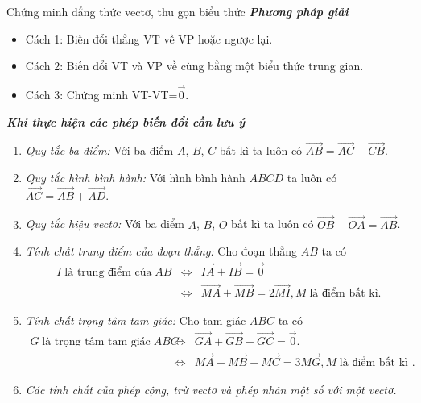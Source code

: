 \begin{dang}%
	{Chứng minh đẳng thức vectơ, thu gọn biểu thức}
	\textbf{\textit{Phương pháp giải}}
	\begin{itemize}
		\item Cách 1: Biến đổi thẳng VT về VP hoặc ngược lại.
		\item Cách 2: Biến đổi VT và VP về cùng bằng một biểu thức trung gian.
		\item Cách 3: Chứng minh VT-VT=$\vec{0}$.
	\end{itemize}
	\textit{\textbf{Khi thực hiện các phép biến đổi cần lưu ý}}
	\begin{enumerate}
		\item \textit{Quy tắc ba điểm:} Với ba điểm $A$, $B$, $C$ bất kì ta luôn có
		      $ \overrightarrow {AB}= \overrightarrow {AC}  +  \overrightarrow{CB}$.
		\item \textit{Quy tắc hình bình hành:} Với hình bình hành $ABCD$ ta luôn có
		      $ \overrightarrow {AC}= \overrightarrow {AB}  +  \overrightarrow{A D}$.
		\item \textit{Quy tắc hiệu vectơ:} Với ba điểm $A$, $B$, $O$ bất kì ta luôn có
		      $ \overrightarrow {OB} -  \overrightarrow{OA}= \overrightarrow {AB}$.
		\item \textit{Tính chất trung điểm của đoạn thẳng:} Cho đoạn thẳng $AB$ ta
		      có
		      \allowdisplaybreaks
		      \begin{eqnarray*}
			      I\;\text{là trung điểm của}\;AB&\Leftrightarrow&
			      \overrightarrow {IA} + \overrightarrow{IB}= \overrightarrow {0}\\
			      &\Leftrightarrow&
			      \overrightarrow {MA}  +  \overrightarrow{MB}=2\overrightarrow{MI}, M \;\text{là điểm bất kì}.
		      \end{eqnarray*}
		\item \textit{Tính chất trọng tâm tam giác:} Cho tam giác $ABC$ ta có
		      \allowdisplaybreaks
		      \begin{eqnarray*}
			      G\;\text{là trọng tâm tam giác}\; ABC &\Leftrightarrow&
			      \overrightarrow {GA}  +  \overrightarrow{GB}  +  \overrightarrow{GC}= \overrightarrow {0}.\\
			      &\Leftrightarrow& \overrightarrow {MA}  +  \overrightarrow{MB}  +  \overrightarrow{MC}=3 \overrightarrow {MG}, M\;\text{là điểm bất kì }.
		      \end{eqnarray*}
		\item \textit{Các tính chất của phép cộng, trừ vectơ và phép nhân một số với một vectơ.}
	\end{enumerate}
\end{dang}
